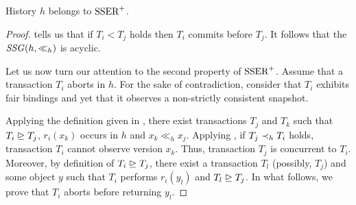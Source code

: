\begin{theorem}
  History $h$ belongs to $\SPSER$.
\end{theorem}

\begin{proof}
   tells us that if $T_i < T_j$ holds then $T_i$ commits before $T_j$.
  It follows that the $\SSG(h,\ll_h)$ is acyclic.

  Let us now turn our attention to the second property of $\SPSER$.
  Assume that a transaction $T_i$ aborts in $h$.
  For the sake of contradiction, consider that $T_i$ exhibits fair bindings and yet that it observes a non-strictly consistent snapshot.

  Applying the definition given in , there exist transactions $T_j$ and $T_k$ such that $T_i \mathrel{\unrhd} T_j$, $r_i(x_k)$ occurs in $h$ and $x_k \ll_h x_j$.  
  Applying , if $T_j \hb_{h} T_i$ holds, transaction $T_i$ cannot observe version $x_k$.
  Thus, transaction $T_j$ is concurrent to $T_i$.
  Moreover, by definition of $T_i \mathrel{\unrhd} T_j$, there exist a transaction $T_l$ (possibly, $T_j$) and some object $y$ such that $T_i$ performs $r_i(y_l)$ and $T_l \mathrel{\unrhd} T_j$.
  In what follows, we prove that $T_i$ aborts before returning $y_l$.
  

\end{proof}
